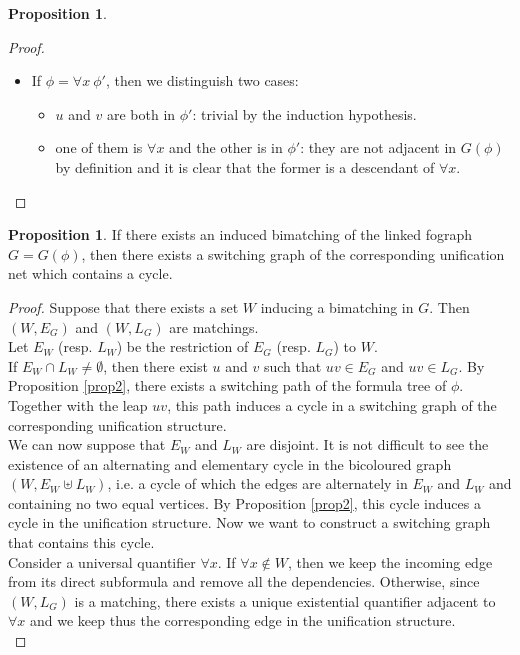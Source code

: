\documentclass{article}
\theoremstyle{definition}
\newtheorem{proposition}[thm]{Proposition}
\begin{document}
\begin{proposition}
\begin{proof}
\begin{itemize}
\begin{itemize}
    \end{itemize}
  \item If $\phi = \forall x \ \phi'$, then we distinguish two cases:
    \begin{itemize}
      \item $u$ and $v$ are both in $\phi'$: trivial by the induction
	      hypothesis.
      \item one of them is $\forall x$ and the other is in $\phi'$:
	they are not adjacent in $G(\phi)$ by definition and it is clear that
		    the former is a descendant of $\forall x$.
    \end{itemize}
\end{itemize}
\end{proof}
\end{proposition}

\begin{proposition}
If there exists an induced bimatching of the linked fograph $G = G(\phi)$, then there exists a switching graph of the corresponding unification net which contains a cycle.
\begin{proof}
  Suppose that there exists a set $W$ inducing a bimatching in $G$.
  Then $(W, E_G)$ and $(W, L_G)$ are matchings.\\
  Let $E_W$ (resp. $L_W$) be the restriction of $E_G$ (resp. $L_G$) to $W$. \\
  If $E_W \cap L_W \neq \emptyset$, then there exist $u$ and $v$ such that $uv
  \in E_G$ and $uv \in L_G$. By Proposition \ref{prop2}, there exists a
  switching path of the formula tree of $\phi$. Together with the leap
  $uv$, this path induces a cycle in a switching graph of the
  corresponding unification structure. \\
  We can now suppose that $E_W$ and $L_W$ are disjoint. It is not difficult to
  see the existence of an alternating and elementary cycle  in the bicoloured graph $(W, E_W \uplus L_W)$, i.e. a cycle of which the edges are alternately in $E_W$ and $L_W$ and containing no two equal vertices.
  By Proposition \ref{prop2}, this cycle induces a cycle in the unification
  structure. Now we want to construct a switching graph that contains this cycle.\\
  Consider a universal quantifier $\forall x$. If $\forall x \notin W$, then        
  we keep the incoming edge from its direct subformula and remove all the 
  dependencies. Otherwise, since $(W, L_G)$ is a matching, there exists a
  unique existential quantifier adjacent to $\forall x$ and we keep thus the
  corresponding edge in the unification structure. \\

\end{proof}
\end{proposition}
\end{document}

